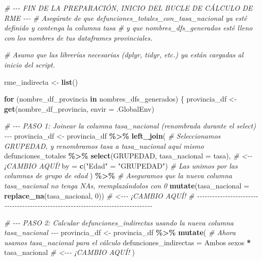 \documentclass[
]{article}
\newenvironment{Shaded}{\begin{snugshade}}{\end{snugshade}}
\newcommand{\AttributeTok}[1]{\textcolor[rgb]{0.13,0.29,0.53}{#1}}
\newcommand{\CommentTok}[1]{\textcolor[rgb]{0.56,0.35,0.01}{\textit{#1}}}
\newcommand{\ControlFlowTok}[1]{\textcolor[rgb]{0.13,0.29,0.53}{\textbf{#1}}}
\newcommand{\DecValTok}[1]{\textcolor[rgb]{0.00,0.00,0.81}{#1}}
\newcommand{\FunctionTok}[1]{\textcolor[rgb]{0.13,0.29,0.53}{\textbf{#1}}}
\newcommand{\NormalTok}[1]{#1}
\newcommand{\OtherTok}[1]{\textcolor[rgb]{0.56,0.35,0.01}{#1}}
\newcommand{\SpecialCharTok}[1]{\textcolor[rgb]{0.81,0.36,0.00}{\textbf{#1}}}
\newcommand{\StringTok}[1]{\textcolor[rgb]{0.31,0.60,0.02}{#1}}
\begin{document}
\begin{Shaded}
\begin{Highlighting}[]
\CommentTok{\# {-}{-}{-} FIN DE LA PREPARACIÓN, INICIO DEL BUCLE DE CÁLCULO DE RME {-}{-}{-}}
\CommentTok{\# Asegúrate de que defunciones\_totales\_con\_tasa\_nacional ya esté definido y contenga la columna \textquotesingle{}tasa\textquotesingle{}}
\CommentTok{\# y que nombres\_dfs\_generados esté lleno con los nombres de tus dataframes provinciales.}

\CommentTok{\# Asumo que las librerías necesarias (dplyr, tidyr, etc.) ya están cargadas al inicio del script.}

\NormalTok{rme\_indirecta }\OtherTok{\textless{}{-}} \FunctionTok{list}\NormalTok{()}

\ControlFlowTok{for}\NormalTok{ (nombre\_df\_provincia }\ControlFlowTok{in}\NormalTok{ nombres\_dfs\_generados) \{}
\NormalTok{  provincia\_df }\OtherTok{\textless{}{-}} \FunctionTok{get}\NormalTok{(nombre\_df\_provincia, }\AttributeTok{envir =}\NormalTok{ .GlobalEnv)}

  \CommentTok{\# {-}{-}{-} PASO 1: Joinear la columna \textquotesingle{}tasa\_nacional\textquotesingle{} (renombrada durante el select) {-}{-}{-}}
\NormalTok{  provincia\_df }\OtherTok{\textless{}{-}}\NormalTok{ provincia\_df }\SpecialCharTok{\%\textgreater{}\%}
    \FunctionTok{left\_join}\NormalTok{(}
      \CommentTok{\# Seleccionamos GRUPEDAD, y renombramos \textquotesingle{}tasa\textquotesingle{} a \textquotesingle{}tasa\_nacional\textquotesingle{} aquí mismo}
\NormalTok{      defunciones\_totales }\SpecialCharTok{\%\textgreater{}\%} \FunctionTok{select}\NormalTok{(GRUPEDAD, }\AttributeTok{tasa\_nacional =}\NormalTok{ tasa), }\CommentTok{\# \textless{}{-}{-} ¡CAMBIO AQUÍ!}
      \AttributeTok{by =} \FunctionTok{c}\NormalTok{(}\StringTok{"Edad"} \OtherTok{=} \StringTok{"GRUPEDAD"}\NormalTok{) }\CommentTok{\# Las unimos por las columnas de grupo de edad}
\NormalTok{    ) }\SpecialCharTok{\%\textgreater{}\%}
    \CommentTok{\# Aseguramos que la nueva columna \textquotesingle{}tasa\_nacional\textquotesingle{} no tenga NAs, reemplazándolos con 0}
    \FunctionTok{mutate}\NormalTok{(}\AttributeTok{tasa\_nacional =} \FunctionTok{replace\_na}\NormalTok{(tasa\_nacional, }\DecValTok{0}\NormalTok{)) }\CommentTok{\# \textless{}{-}{-}{-} ¡CAMBIO AQUÍ!}
  \CommentTok{\# {-}{-}{-}{-}{-}{-}{-}{-}{-}{-}{-}{-}{-}{-}{-}{-}{-}{-}{-}{-}{-}{-}{-}{-}{-}{-}{-}{-}{-}{-}{-}{-}{-}{-}{-}{-}{-}{-}{-}{-}{-}{-}{-}{-}{-}{-}{-}{-}{-}{-}{-}{-}{-}{-}{-}{-}{-}{-}{-}{-}{-}{-}{-}{-}{-}{-}{-}{-}{-}{-}{-}{-}{-}{-}{-}{-}{-}{-}{-}{-}{-}{-}}

  \CommentTok{\# {-}{-}{-} PASO 2: Calcular \textquotesingle{}defunciones\_indirectas\textquotesingle{} usando la nueva columna \textquotesingle{}tasa\_nacional\textquotesingle{} {-}{-}{-}}
\NormalTok{  provincia\_df }\OtherTok{\textless{}{-}}\NormalTok{ provincia\_df }\SpecialCharTok{\%\textgreater{}\%}
    \FunctionTok{mutate}\NormalTok{(}
      \CommentTok{\# Ahora usamos \textquotesingle{}tasa\_nacional\textquotesingle{} para el cálculo}
      \AttributeTok{defunciones\_indirectas =} \StringTok{\textasciigrave{}}\AttributeTok{Ambos sexos}\StringTok{\textasciigrave{}} \SpecialCharTok{*}\NormalTok{ tasa\_nacional }\CommentTok{\# \textless{}{-}{-}{-} ¡CAMBIO AQUÍ!}
\NormalTok{    )}


\end{Highlighting}
\end{Shaded}
\end{document}
